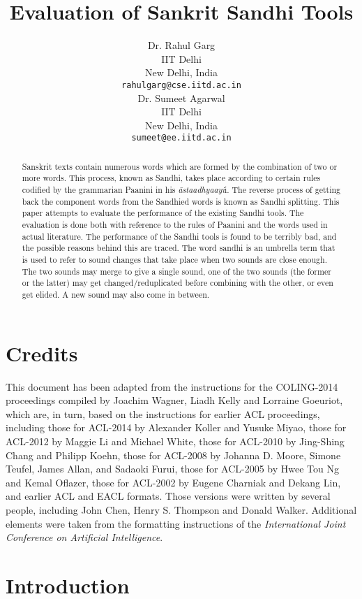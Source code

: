 \documentclass[11pt]{article}
\title{Evaluation of Sankrit Sandhi Tools}
\author{Dr. Rahul Garg \\
 IIT Delhi \\
  New Delhi, India \\
  {\tt rahulgarg@cse.iitd.ac.in} \\\And
  Dr. Sumeet Agarwal \\
  IIT Delhi \\
 New Delhi, India \\
  {\tt sumeet@ee.iitd.ac.in} \\}
\date{}
\begin{document}
\maketitle
\begin{abstract}
  Sanskrit texts contain numerous words which are formed by the combination of two or more words. This process, known as Sandhi, takes place according to certain rules codified by the grammarian Paanini in his \textit{  āstaadhyaayi}i. The reverse process of getting back the component words from the Sandhied words is known as Sandhi splitting. This paper attempts to evaluate the performance of the existing Sandhi tools.  The evaluation is done both with reference to the rules of Paanini and the words used in actual literature. The performance of the Sandhi tools is found to be terribly bad, and the possible reasons behind this are traced.  
The word sandhi is an umbrella term that is used to refer to sound changes that take place when two sounds are close enough. The two sounds may merge to give a single sound, one of the two sounds (the former or the latter) may get changed/reduplicated before combining with the other, or even get elided. A new sound may also come in between. 



\end{abstract}

\section{Credits}

This document has been adapted from the instructions for the
COLING-2014 proceedings compiled by Joachim Wagner, Liadh Kelly
and Lorraine Goeuriot,
which are, in turn, based on the instructions for earlier ACL proceedings,
including 
those for ACL-2014 by Alexander Koller and Yusuke Miyao,
those for ACL-2012 by Maggie Li and Michael
White, those for ACL-2010 by Jing-Shing Chang and Philipp Koehn,
those for ACL-2008 by Johanna D. Moore, Simone Teufel, James Allan,
and Sadaoki Furui, those for ACL-2005 by Hwee Tou Ng and Kemal
Oflazer, those for ACL-2002 by Eugene Charniak and Dekang Lin, and
earlier ACL and EACL formats. Those versions were written by several
people, including John Chen, Henry S. Thompson and Donald
Walker. Additional elements were taken from the formatting
instructions of the {\em International Joint Conference on Artificial
  Intelligence}.

\section{Introduction}
\label{intro}
\end{document}
